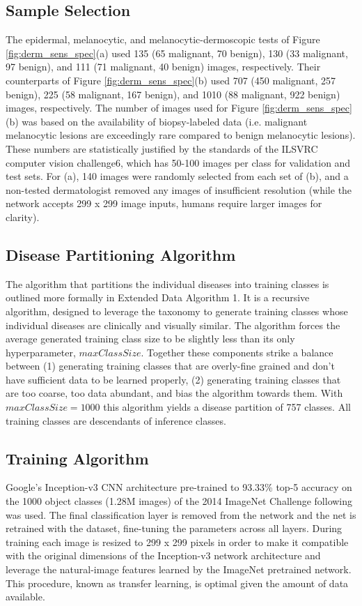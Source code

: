 \subsection{Sample Selection}
The epidermal, melanocytic, and melanocytic-dermoscopic tests of Figure \ref{fig:derm_sens_spec}(a) used 135 (65 malignant, 70 benign), 130 (33 malignant, 97 benign), and 111 (71 malignant, 40 benign) images, respectively. Their counterparts of Figure \ref{fig:derm_sens_spec}(b) used 707 (450 malignant, 257 benign), 225 (58 malignant, 167 benign), and 1010 (88 malignant, 922 benign) images, respectively. The number of images used for Figure \ref{fig:derm_sens_spec}(b) was based on the availability of biopsy-labeled data (i.e. malignant melanocytic lesions are exceedingly rare compared to benign melanocytic lesions). These numbers are statistically justified by the standards of the ILSVRC computer vision challenge6, which has 50-100 images per class for validation and test sets. For (a), 140 images were randomly selected from each set of (b), and a non-tested dermatologist removed any images of insufficient resolution (while the network accepts 299 x 299 image inputs, humans require larger images for clarity).

\subsection{Disease Partitioning Algorithm}
The algorithm that partitions the individual diseases into training classes is outlined more formally in Extended Data Algorithm 1. It is a recursive algorithm, designed to leverage the taxonomy to generate training classes whose individual diseases are clinically and visually similar. The algorithm forces the average generated training class size to be slightly less than its only hyperparameter, $maxClassSize$. Together these components strike a balance between (1) generating training classes that are overly-fine grained and don’t have sufficient data to be learned properly, (2) generating training classes that are too coarse, too data abundant, and bias the algorithm towards them. With $maxClassSize = 1000$ this algorithm yields a disease partition of 757 classes. All training classes are descendants of inference classes.

\subsection{Training Algorithm}
Google’s Inception-v3 CNN architecture pre-trained to 93.33\% top-5 accuracy on the 1000 object classes (1.28M images) of the 2014 ImageNet Challenge following \cite{szegedy2016rethinking} was used. The final classification layer is removed from the network and the net is retrained with the dataset, fine-tuning the parameters across all layers. During training each image is resized to 299 x 299 pixels in order to make it compatible with the original dimensions of the Inception-v3 network architecture and leverage the natural-image features learned by the ImageNet pretrained network. This procedure, known as transfer learning, is optimal given the amount of data available.

